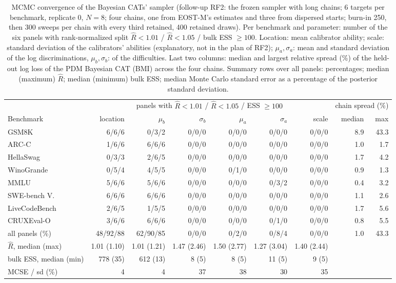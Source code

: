 \begin{table}[tbp]
\centering\scriptsize
\caption{MCMC convergence of the Bayesian CATs' sampler (follow-up RF2: the frozen sampler with long chains; 6 targets per benchmark, replicate 0, $N=8$; four chains, one from EOST-M's estimates and three from dispersed starts; burn-in 250, then 300 sweeps per chain with every third retained, 400 retained draws). Per benchmark and parameter: number of the six panels with rank-normalized split $\hat R<1.01$ / $\hat R<1.05$ / bulk ESS $\ge100$. Location: mean calibrator ability; scale: standard deviation of the calibrators' abilities (explanatory, not in the plan of RF2); $\mu_a,\sigma_a$: mean and standard deviation of the log discriminations, $\mu_b,\sigma_b$: of the difficulties. Last two columns: median and largest relative spread (\%) of the held-out log loss of the PDM Bayesian CAT (BMI) across the four chains. Summary rows over all panels: percentages; median (maximum) $\hat R$; median (minimum) bulk ESS; median Monte Carlo standard error as a percentage of the posterior standard deviation.}
\label{tab:rf2}
\setlength{\tabcolsep}{2pt}
\begin{tabular}{@{}lrrrrrrrr@{}}
\toprule
 & \multicolumn{6}{c}{panels with $\hat R<1.01$ / $\hat R<1.05$ / ESS $\ge100$} & \multicolumn{2}{c}{chain spread (\%)} \\
\cmidrule(lr){2-7}\cmidrule(l){8-9}
Benchmark & location & $\mu_b$ & $\sigma_b$ & $\mu_a$ & $\sigma_a$ & scale & median & max \\
\midrule
GSM8K & 6/6/6 & 0/3/2 & 0/0/0 & 0/0/0 & 0/0/0 & 0/0/0 & 8.9 & 43.3 \\
ARC-C & 1/6/6 & 6/6/6 & 0/0/0 & 0/0/0 & 0/0/0 & 0/0/0 & 1.0 & 1.7 \\
HellaSwag & 0/3/3 & 2/6/5 & 0/0/0 & 0/0/0 & 0/0/0 & 0/0/0 & 1.7 & 4.2 \\
WinoGrande & 0/5/4 & 4/5/5 & 0/0/0 & 0/1/0 & 0/0/0 & 0/0/0 & 0.9 & 1.3 \\
MMLU & 5/6/6 & 5/6/6 & 0/0/0 & 0/0/0 & 0/3/2 & 0/0/0 & 0.4 & 3.2 \\
SWE-bench V. & 6/6/6 & 6/6/6 & 0/0/0 & 0/0/0 & 0/0/0 & 0/0/0 & 1.1 & 2.6 \\
LiveCodeBench & 2/6/5 & 1/5/5 & 0/0/0 & 0/0/0 & 0/0/0 & 0/0/0 & 1.7 & 5.6 \\
CRUXEval-O & 3/6/6 & 6/6/6 & 0/0/0 & 0/0/0 & 0/1/0 & 0/0/0 & 0.8 & 5.5 \\
\addlinespace
all panels (\%) & 48/92/88 & 62/90/85 & 0/0/0 & 0/2/0 & 0/8/4 & 0/0/0 & 1.0 & 43.3 \\
$\hat R$, median (max) & 1.01 (1.10) & 1.01 (1.21) & 1.47 (2.46) & 1.50 (2.77) & 1.27 (3.04) & 1.40 (2.44) & & \\
bulk ESS, median (min) & 778 (35) & 612 (13) & 8 (5) & 8 (5) & 11 (5) & 9 (5) & & \\
MCSE / sd (\%) & 4 & 4 & 37 & 38 & 30 & 35 & & \\
\bottomrule
\end{tabular}
\end{table}


